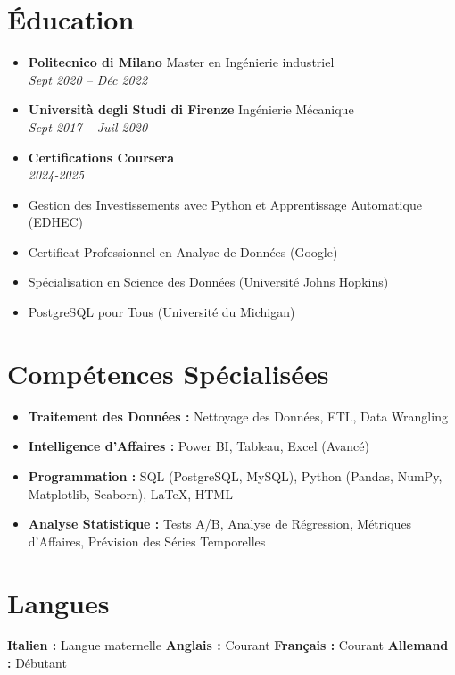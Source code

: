 \documentclass[letterpaper,10.5pt]{article}
\newcommand{\resumeEntry}[4]{
  \item\textbf{#1} \hfill #2\\
  \textit{#3} \hfill \textit{#4}
}
\begin{document}
\section*{Éducation}
\begin{itemize}[leftmargin=0.2in]
    \resumeEntry{Politecnico di Milano}{Master en Ingénierie industriel}{Sept 2020 -- Déc 2022}{}
    \resumeEntry{Università degli Studi di Firenze}{Ingénierie Mécanique}{Sept 2017 -- Juil 2020}{}
    \resumeEntry{Certifications Coursera}{}{2024-2025}{}
\end{itemize}
\begin{multicols}{2}
    \small
    \begin{itemize}[leftmargin=0.4 in, label={-}]
        \item Gestion des Investissements avec Python et Apprentissage Automatique (EDHEC)
        \item Certificat Professionnel en Analyse de Données (Google)
    \end{itemize}
    \begin{itemize}[leftmargin=0.3 in, label={-}]
        \item Spécialisation en Science des Données (Université Johns Hopkins)
        \item PostgreSQL pour Tous (Université du Michigan)
    \end{itemize}
\end{multicols}

\section*{Compétences Spécialisées}\vspace{-15pt}
\begin{multicols}{2}
\begin{itemize}[leftmargin=0.2in]
    \item \textbf{Traitement des Données :} Nettoyage des Données, ETL, Data Wrangling
    \item \textbf{Intelligence d'Affaires :} Power BI, Tableau, Excel (Avancé)
    \item \textbf{Programmation :} SQL (PostgreSQL, MySQL), Python (Pandas, NumPy, Matplotlib, Seaborn), LaTeX, HTML
    \item \textbf{Analyse Statistique :} Tests A/B, Analyse de Régression, Métriques d'Affaires, Prévision des Séries Temporelles
\end{itemize}
\end{multicols}

\section*{Langues}\vspace{-5pt}
\textbf{Italien :} Langue maternelle \hspace{20pt} \textbf{Anglais :} Courant \hspace{20pt} \textbf{Français :} Courant \hspace{20pt} \textbf{Allemand :} Débutant
\end{document}
